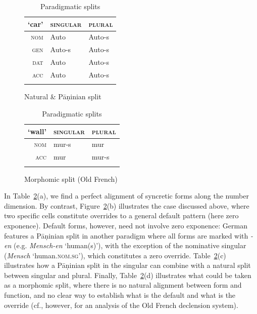 \documentclass[output=paper
	        ,collection
	        ,collectionchapter
 	        ,biblatex
                ,babelshorthands
                ,newtxmath
                ,draftmode
                ,colorlinks, citecolor=brown
]{langscibook}
\begin{document}
\begin{table}[htb]
\begin{subfigure}{.45\textwidth}
    \begin{tabular}{r|ll}
        \lsptoprule
        `car' & \textsc{singular} & \textsc{plural}\\
        \midrule
        \textsc{nom} & Auto & Auto-s\\
        \textsc{gen} & Auto-s & Auto-s\\
        \textsc{dat} & Auto & Auto-s\\
        \textsc{acc} & Auto & Auto-s\\
        \lspbottomrule
      \end{tabular}
      \caption{Natural \& Pāṇinian split}
    \end{subfigure}
  \begin{subfigure}{.50\textwidth}

    \centering
    \begin{tabular}{r|ll}
      \lsptoprule
      `wall' & \textsc{singular} & \textsc{plural}\\
      \midrule
      \textsc{nom} & mur-s & mur\\
      \textsc{acc} & mur & mur-s\\
      \lspbottomrule
    \end{tabular}

    \caption{Morphomic split (Old French)}
  \end{subfigure}
  
  
  \caption{Paradigmatic splits}
  \label{tab:ParaSplit}
\end{table}

In Table~\ref{tab:ParaSplit}(a), we find a perfect alignment of
syncretic forms along the number dimension. By contrast,
Figure~\ref{tab:ParaSplit}(b) illustrates the case discussed above,
where two specific cells constitute overrides to a general default
pattern (here zero exponence). Default forms, however, need not
involve zero exponence: German features a Pāṇinian split in another
paradigm where all forms are marked with \textit{-en}
(e.g. \textit{Mensch-en} `human(s)'), with the exception of the
nominative singular (\textit{Mensch} `human\textsc{.nom.sg}'), which
constitutes a zero override. Table~\ref{tab:ParaSplit}(c) illustrates
how a Pāṇinian split in the singular can combine with a natural split
between singular and plural. Finally, Table~\ref{tab:ParaSplit}(d)
illustrates what could be taken as a morphomic split, where there is no
natural alignment between form and function, and no clear way to
establish what is the default and what is the override (cf., however,
\citealt{Crysmann:Kihm:2018} for an analysis of the Old French
declension system).
\end{document}

